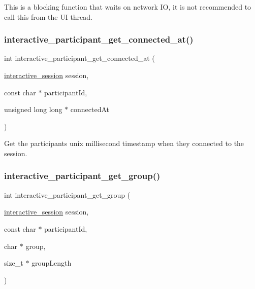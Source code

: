 This is a blocking function that waits on network IO, it is not recommended to call this from the UI thread. \mbox{\label{group___interactivity_gaf90a6e1366b0c439075686f1218b7d91}} 
\subsubsection{\texorpdfstring{interactive\+\_\+participant\+\_\+get\+\_\+connected\+\_\+at()}{interactive\_participant\_get\_connected\_at()}}
{\footnotesize\ttfamily int interactive\+\_\+participant\+\_\+get\+\_\+connected\+\_\+at (\begin{DoxyParamCaption}\item[{\mbox{\hyperlink{group___interactivity_ga6d8819d38b8dc8994a2299cf22a65a31}{interactive\+\_\+session}}}]{session,  }\item[{const char $\ast$}]{participant\+Id,  }\item[{unsigned long long $\ast$}]{connected\+At }\end{DoxyParamCaption})}



Get the participant\textquotesingle{}s unix millisecond timestamp when they connected to the session. 

\mbox{\label{group___interactivity_ga3a312c89bf461e7163d9e66bd16e80f4}} 
\subsubsection{\texorpdfstring{interactive\+\_\+participant\+\_\+get\+\_\+group()}{interactive\_participant\_get\_group()}}
{\footnotesize\ttfamily int interactive\+\_\+participant\+\_\+get\+\_\+group (\begin{DoxyParamCaption}\item[{\mbox{\hyperlink{group___interactivity_ga6d8819d38b8dc8994a2299cf22a65a31}{interactive\+\_\+session}}}]{session,  }\item[{const char $\ast$}]{participant\+Id,  }\item[{char $\ast$}]{group,  }\item[{size\+\_\+t $\ast$}]{group\+Length }\end{DoxyParamCaption})}



